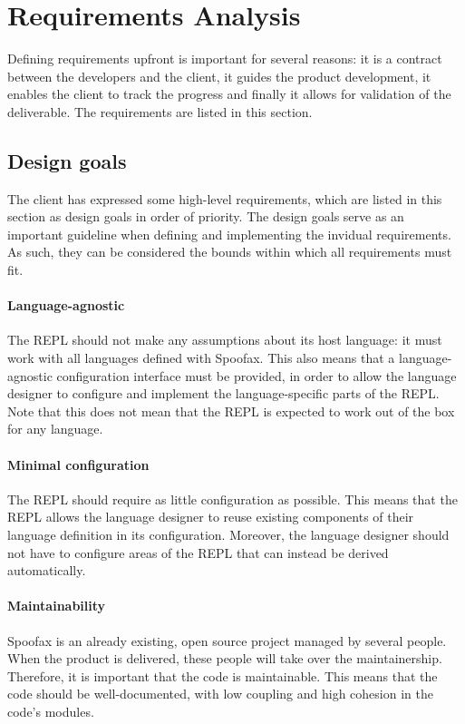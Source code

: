 \section{Requirements Analysis}
\label{sec:requirement-analysis}

Defining requirements upfront is important for several reasons: it is a contract
between the developers and the client, it guides the product development, it
enables the client to track the progress and finally it allows for validation of the
deliverable. The requirements are listed in this section.

\subsection{Design goals}
\label{ssec:goals}

The client has expressed some high-level requirements, which are listed in this
section as design goals in order of priority. The design goals serve as an
important guideline when defining and implementing the invidual requirements. As
such, they can be considered the bounds within which all requirements must fit.

\paragraph{Language-agnostic} The REPL should not make any assumptions about its
host language: it must work with all languages defined with Spoofax. This also
means that a language-agnostic configuration interface must be provided, in
order to allow the language designer to configure and implement the
language-specific parts of the REPL. Note that this does not mean that the REPL
is expected to work out of the box for any language.

\paragraph{Minimal configuration} The REPL should require as little
configuration as possible. This means that the REPL allows the
language designer to reuse existing components of their language
definition in its configuration. Moreover, the language
designer should not have to configure areas of the REPL that can
instead be derived automatically.

\paragraph{Maintainability} Spoofax is an already existing, open source project
managed by several people. When the product is delivered, these people will take
over the maintainership. Therefore, it is important that the code is
maintainable. This means that the code should be well-documented, with low
coupling and high cohesion in the code's modules.

